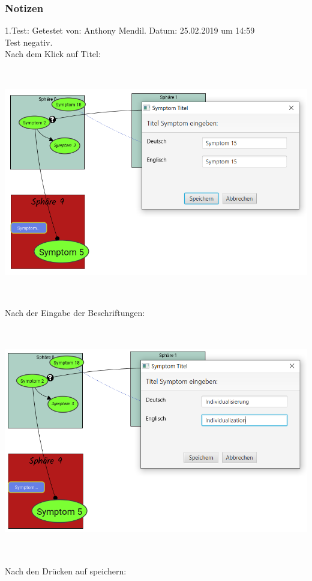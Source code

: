 \documentclass{scrartcl}
\begin{document}
\subsubsection{Notizen}
1.Test: Getestet von: Anthony Mendil. Datum: 25.02.2019 um 14:59 \\
Test negativ. \\
Nach dem Klick auf Titel: 
\begin{center}
\includegraphics[height=10cm]{3_44oeffnen.PNG}
\end{center}
Nach der Eingabe der Beschriftungen:
\begin{center}
\includegraphics[height=10cm]{3_44eingabe.PNG}
\end{center}
Nach den Drücken auf speichern:
\end{document}
